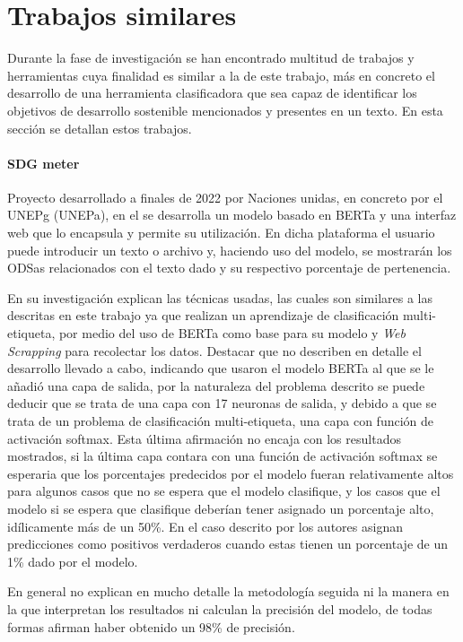 \section{Trabajos similares}
Durante la fase de investigación se han encontrado multitud de trabajos y
herramientas cuya finalidad es similar a la de este trabajo, más en concreto el
desarrollo de una herramienta clasificadora que sea capaz de identificar los
objetivos de desarrollo sostenible mencionados y presentes en un texto. En esta
sección se detallan estos trabajos.

\paragraph{SDG meter}Proyecto desarrollado a finales de 2022 por Naciones
unidas, en concreto por el \gls{UNEPg} (\gls{UNEPa}), en el se desarrolla un modelo basado en \gls{BERTa} y una interfaz
web que lo encapsula y permite su utilización. En dicha plataforma el usuario
puede introducir un texto o archivo y, haciendo uso del modelo, se mostrarán los
\gls{ODSa}s relacionados con el texto dado y su respectivo porcentaje de pertenencia.
\cite{SDGmeter}

En su investigación explican las técnicas usadas, las cuales son similares a las
descritas en este trabajo ya que realizan un aprendizaje de clasificación multi-etiqueta, por medio del uso de \gls{BERTa} como base para su modelo y \textit{Web Scrapping}
para recolectar los datos. Destacar que no describen en detalle el desarrollo
llevado a cabo, indicando que usaron el modelo \gls{BERTa} al que se le añadió una capa
de salida, por la naturaleza del problema descrito se puede deducir que se trata
de una capa con 17 neuronas de salida, y debido a que se trata de un problema de
clasificación multi-etiqueta, una capa con función de activación softmax. Esta
última afirmación no encaja con los resultados mostrados, si la última capa
contara con una función de activación softmax se esperaria que los porcentajes
predecidos por el modelo fueran relativamente altos para algunos casos que no se
espera que el modelo clasifique, y los casos que el modelo si se espera que
clasifique deberían tener asignado un porcentaje alto, idílicamente más de un
50\%. En el caso descrito por los autores asignan predicciones como positivos
verdaderos cuando estas tienen un porcentaje de un 1\% dado por el modelo. 

En general no explican en mucho detalle la metodología seguida ni la manera en
la que interpretan los resultados ni calculan la precisión del modelo, de todas
formas afirman haber obtenido un 98\% de precisión.

